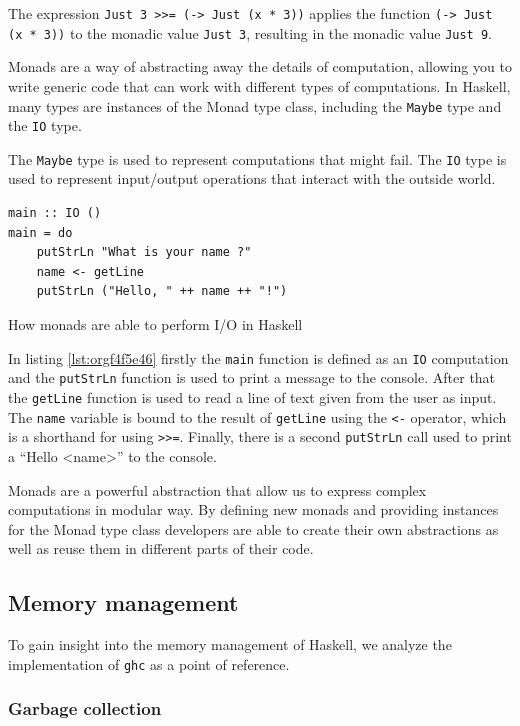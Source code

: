 \documentclass[a4paper, titlepage, twoside]{article}
\begin{document}
The expression \texttt{Just 3 >>= (\x -> Just (x * 3))} applies the function \texttt{(\x -> Just (x * 3))} to the monadic value \texttt{Just 3}, resulting in the monadic value \texttt{Just 9}.

Monads are a way of abstracting away the details of computation, allowing you to write generic code that can work with different types of computations. In Haskell, many types are instances of the Monad type class, including the \texttt{Maybe} type and the \texttt{IO} type.

The \texttt{Maybe} type is used to represent computations that might fail. The \texttt{IO} type is used to represent input/output operations that interact with the outside world.

\begin{listing}[htbp]
\begin{verbatim}
main :: IO ()
main = do
    putStrLn "What is your name ?"
    name <- getLine
    putStrLn ("Hello, " ++ name ++ "!")
\end{verbatim}
\caption{\label{lst:orgf4f5e46}How monads are able to perform I/O in Haskell}
\end{listing}

In listing \ref{lst:orgf4f5e46} firstly the \texttt{main} function is defined as an \texttt{IO} computation and the \texttt{putStrLn} function is used to print a message to the console. After that the \texttt{getLine} function is used to read a line of text given from the user as input. The \texttt{name} variable is bound to the result of \texttt{getLine} using the \texttt{<-} operator, which is a shorthand for using \texttt{>{}>{}=}. Finally, there is a second \texttt{putStrLn} call used to print a ``Hello <name>'' to the console.

Monads are a powerful abstraction that allow us to express complex computations in modular way. By defining new monads and providing instances for the Monad type class developers are able to create their own abstractions as well as reuse them in different parts of their code.

\subsection{Memory management}
\label{sec:org717d302}

To gain insight into the memory management of Haskell, we analyze the implementation of \texttt{ghc} as a point of reference.

\subsubsection{Garbage collection}
\label{sec:orgd4de5e4}
\end{document}
